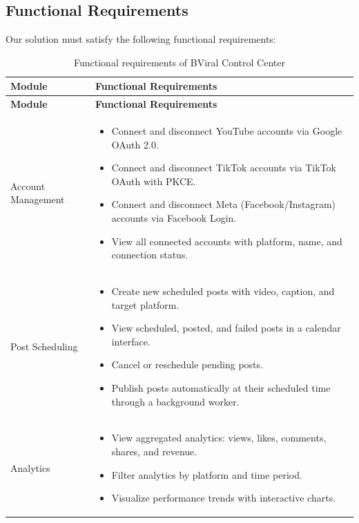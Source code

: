\subsection{Functional Requirements}
Our solution must satisfy the following functional requirements:

\begin{longtable}{|p{4cm}|p{10cm}|}
\caption{Functional requirements of BViral Control Center}
\label{tab:functional-requirements} \\
\hline
\textbf{Module} & \textbf{Functional Requirements} \\
\hline
\endfirsthead

\hline
\textbf{Module} & \textbf{Functional Requirements} \\
\hline
\endhead

Account Management &
\begin{itemize}
    \item Connect and disconnect YouTube accounts via Google OAuth 2.0.
    \item Connect and disconnect TikTok accounts via TikTok OAuth with PKCE.
    \item Connect and disconnect Meta (Facebook/Instagram) accounts via Facebook Login.
    \item View all connected accounts with platform, name, and connection status.
\end{itemize} \\
\hline

Post Scheduling &
\begin{itemize}
    \item Create new scheduled posts with video, caption, and target platform.
    \item View scheduled, posted, and failed posts in a calendar interface.
    \item Cancel or reschedule pending posts.
    \item Publish posts automatically at their scheduled time through a background worker.
\end{itemize} \\
\hline

Analytics &
\begin{itemize}
    \item View aggregated analytics: views, likes, comments, shares, and revenue.
    \item Filter analytics by platform and time period.
    \item Visualize performance trends with interactive charts.
\end{itemize} \\
\hline


\end{longtable}
